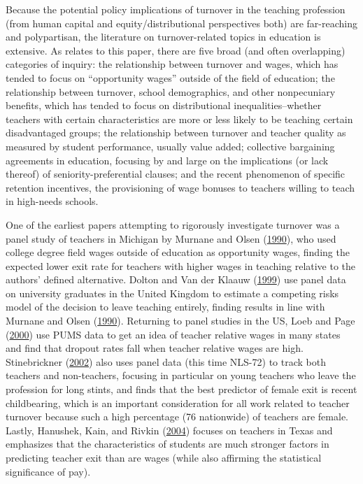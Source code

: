 \documentclass[]{article}
\begin{document}
Because the potential policy implications of turnover in the teaching
profession (from human capital and equity/distributional perspectives
both) are far-reaching and polypartisan, the literature on
turnover-related topics in education is extensive. As relates to this
paper, there are five broad (and often overlapping) categories of
inquiry: the relationship between turnover and wages, which has tended
to focus on ``opportunity wages'' outside of the field of education; the
relationship between turnover, school demographics, and other
nonpecuniary benefits, which has tended to focus on distributional
inequalities--whether teachers with certain characteristics are more or
less likely to be teaching certain disadvantaged groups; the
relationship between turnover and teacher quality as measured by student
performance, usually value added; collective bargaining agreements in
education, focusing by and large on the implications (or lack thereof)
of seniority-preferential clauses; and the recent phenomenon of specific
retention incentives, the provisioning of wage bonuses to teachers
willing to teach in high-needs schools.

One of the earliest papers attempting to rigorously investigate turnover
was a panel study of teachers in Michigan by Murnane and Olsen
(\protect\hyperlink{ref-murnane}{1990}), who used college degree field
wages outside of education as opportunity wages, finding the expected
lower exit rate for teachers with higher wages in teaching relative to
the authors' defined alternative. Dolton and Van der Klaauw
(\protect\hyperlink{ref-dolton}{1999}) use panel data on university
graduates in the United Kingdom to estimate a competing risks model of
the decision to leave teaching entirely, finding results in line with
Murnane and Olsen (\protect\hyperlink{ref-murnane}{1990}). Returning to
panel studies in the US, Loeb and Page
(\protect\hyperlink{ref-loeb}{2000}) use PUMS data to get an idea of
teacher relative wages in many states and find that dropout rates fall
when teacher relative wages are high. Stinebrickner
(\protect\hyperlink{ref-stinebrickner}{2002}) also uses panel data (this
time NLS-72) to track both teachers and non-teachers, focusing in
particular on young teachers who leave the profession for long stints,
and finds that the best predictor of female exit is recent childbearing,
which is an important consideration for all work related to teacher
turnover because such a high percentage (76 nationwide) of teachers are
female. Lastly, Hanushek, Kain, and Rivkin
(\protect\hyperlink{ref-hanushek}{2004}) focuses on teachers in Texas
and emphasizes that the characteristics of students are much stronger
factors in predicting teacher exit than are wages (while also affirming
the statistical significance of pay).
\end{document}
